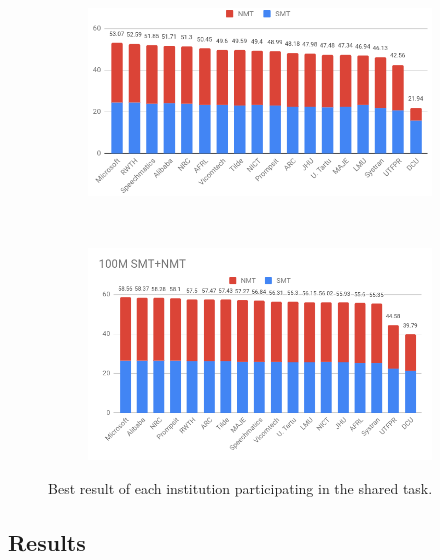 \begin{figure}
  \centering
  \begin{subfigure}[b]{0.5\textwidth}
    \includegraphics[width=\textwidth]{images/10M_crop.png}
  \end{subfigure}
  ~
  \begin{subfigure}[b]{0.5\textwidth}
    \includegraphics[width=\textwidth]{images/100M.png}
  \end{subfigure}
  \caption{Best result of each institution participating in the shared task.}
  \label{fig:results}
\end{figure}

\subsection{Results}

